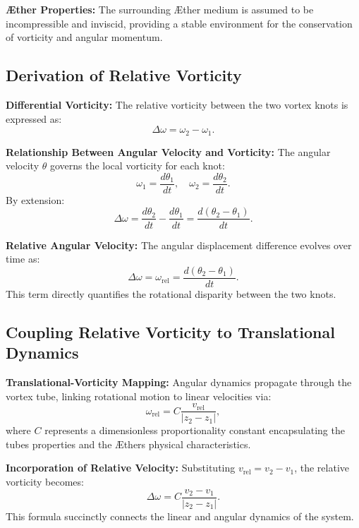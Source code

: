     \textbf{Æther Properties:} The surrounding Æther medium is assumed to be incompressible and inviscid, providing a stable environment for the conservation of vorticity and angular momentum.

    \subsection*{Derivation of Relative Vorticity}
    \textbf{Differential Vorticity:} The relative vorticity between the two vortex knots is expressed as:
    \begin{equation*}
        \Delta \omega = \omega_2 - \omega_1.
    \end{equation*}

    \textbf{Relationship Between Angular Velocity and Vorticity:} The angular velocity $\theta$ governs the local vorticity for each knot:
    \begin{equation*}
        \omega_1 = \frac{d\theta_1}{dt}, \quad \omega_2 = \frac{d\theta_2}{dt}.
    \end{equation*}
    By extension:
    \begin{equation*}
        \Delta \omega = \frac{d\theta_2}{dt} - \frac{d\theta_1}{dt} = \frac{d(\theta_2 - \theta_1)}{dt}.
    \end{equation*}

    \textbf{Relative Angular Velocity:} The angular displacement difference evolves over time as:
    \begin{equation*}
        \Delta \omega = \omega_\text{rel} = \frac{d(\theta_2 - \theta_1)}{dt}.
    \end{equation*}
    This term directly quantifies the rotational disparity between the two knots.

    \subsection*{Coupling Relative Vorticity to Translational Dynamics}
    \textbf{Translational-Vorticity Mapping:} Angular dynamics propagate through the vortex tube, linking rotational motion to linear velocities via:
    \begin{equation*}
        \omega_\text{rel} = C \frac{v_\text{rel}}{|z_2 - z_1|},
    \end{equation*}
    where $C$ represents a dimensionless proportionality constant encapsulating the tube\rqs s properties and the Æther\rqs s physical characteristics.

    \textbf{Incorporation of Relative Velocity:} Substituting $v_\text{rel} = v_2 - v_1$, the relative vorticity becomes:
    \begin{equation*}
        \Delta \omega = C \frac{v_2 - v_1}{|z_2 - z_1|}.
    \end{equation*}
    This formula succinctly connects the linear and angular dynamics of the system.

